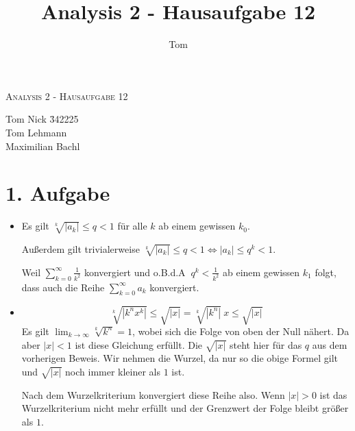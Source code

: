 \documentclass[10pt,a4paper,parskip=half]{scrartcl}
\author{Tom}
\title{Analysis 2 - Hausaufgabe 12}
\begin{document}
\begin{center}
\textsc{\Large{Analysis 2 - Hausaufgabe 12}} \\
\end{center}
\begin{tabbing}
Tom Nick \hspace{1.4cm}\= 342225\\
Tom Lehmann\\
Maximilian Bachl
\end{tabbing}
\section*{1. Aufgabe}
\begin{itemize}
\item
Es gilt $\sqrt[k]{\left|a_k\right|} \le q < 1$ für alle $k$ ab einem gewissen $k_0$. 

Außerdem gilt trivialerweise $\sqrt[k]{\left|a_k\right|} \le q <1 \Leftrightarrow \left|a_k\right| \le q^k <1$. 

Weil $\sum_{k=0}^{\infty} \frac 1 {k^2}$ konvergiert und o.B.d.A $~q^k < \frac 1 {k^2}$ ab einem gewissen $k_1$ folgt, dass auch die Reihe $\sum_{k=0}^{\infty} a_k$ konvergiert.
\item
$$\sqrt[k]{|k^nx^k|} \le \sqrt {|x|} = \sqrt[k]{|k^n|}~x \le \sqrt {|x|}$$
Es gilt $\lim_{k\to\infty} \sqrt[k]{k^n} = 1$, wobei sich die Folge von oben der Null nähert. Da aber $|x| < 1$ ist diese Gleichung erfüllt. Die $ \sqrt {|x|}$ steht hier für das $q$ aus dem vorherigen Beweis. Wir nehmen die Wurzel, da nur so die obige Formel gilt und $\sqrt {|x|}$ noch immer kleiner als $1$ ist. 

Nach dem Wurzelkriterium konvergiert diese Reihe also. Wenn $\left| x \right| > 0$ ist das Wurzelkriterium nicht mehr erfüllt und der Grenzwert der Folge bleibt größer als $1$. 
\end{itemize}
\end{document}
